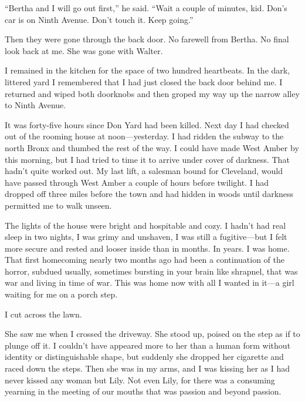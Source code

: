 \documentclass{novel}
\begin{document}
“Bertha and I will go out first,” he said. “Wait a couple of minutes, kid. Don’s car is on Ninth Avenue. Don’t touch it. Keep going.”

Then they were gone through the back door. No farewell from Bertha. No final look back at me. She was gone with Walter.

I remained in the kitchen for the space of two hundred heartbeats. In the dark, littered yard I remembered that I had just closed the back door behind me. I returned and wiped both doorknobs and then groped my way up the narrow alley to Ninth Avenue.

\vspace{2\nbs}
\clearpage
\thispagestyle{empty}


\begin{ChapterStart}
\vspace{3\nbs}
\end{ChapterStart}

It was forty-five hours since Don Yard had been killed. Next day I had checked out of the rooming house at noon—yesterday. I had ridden the subway to the north Bronx and thumbed the rest of the way. I could have made West Amber by this morning, but I had tried to time it to arrive under cover of darkness. That hadn’t quite worked out. My last lift, a salesman bound for Cleveland, would have passed through West Amber a couple of hours before twilight. I had dropped off three miles before the town and had hidden in woods until darkness permitted me to walk unseen.

The lights of the house were bright and hospitable and cozy. I hadn’t had real sleep in two nights, I was grimy and unshaven, I was still a fugitive—but I felt more secure and rested and looser inside than in months. In years. I was home. That first homecoming nearly two months ago had been a continuation of the horror, subdued usually, sometimes bursting in your brain like shrapnel, that was war and living in time of war. This was home now with all I wanted in it—a girl waiting for me on a porch step.

I cut across the lawn.

She saw me when I crossed the driveway. She stood up, poised on the step as if to plunge off it. I couldn’t have appeared more to her than a human form without identity or distinguishable shape, but suddenly she dropped her cigarette and raced down the steps. Then she was in my arms, and I was kissing her as I had never kissed any woman but Lily. Not even Lily, for there was a consuming yearning in the meeting of our mouths that was passion and beyond passion.
\end{document}
